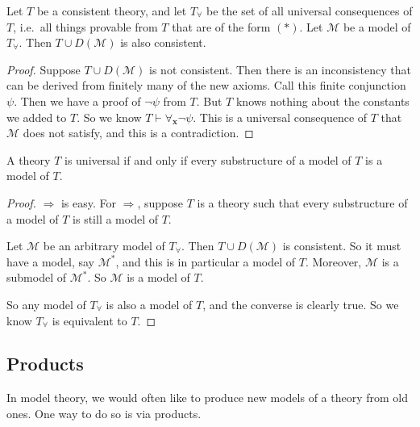 \documentclass[a4paper]{article}
\begin{document}
\begin{lemma}
  Let $T$ be a consistent theory, and let $T_{\forall}$ be the set of all universal consequences of $T$, i.e.\ all things provable from $T$ that are of the form $(*)$. Let $\mathcal{M}$ be a model of $T_\forall$. Then $T \cup D(\mathcal{M})$ is also consistent.
\end{lemma}

\begin{proof}
  Suppose $T \cup D(\mathcal{M})$ is not consistent. Then there is an inconsistency that can be derived from finitely many of the new axioms. Call this finite conjunction $\psi$. Then we have a proof of $\neg \psi$ from $T$. But $T$ knows nothing about the constants we added to $T$. So we know $T\vdash \forall_{\mathbf{x}} \neg \psi$. This is a universal consequence of $T$ that $\mathcal{M}$ does not satisfy, and this is a contradiction.
\end{proof}

\begin{thm}
  A theory $T$ is universal if and only if every substructure of a model of $T$ is a model of $T$.
\end{thm}

\begin{proof}
  $\Rightarrow$ is easy. For $\Rightarrow$, suppose $T$ is a theory such that every substructure of a model of $T$ is still a model of $T$.

  Let $\mathcal{M}$ be an arbitrary model of $T_\forall$. Then $T \cup D(\mathcal{M})$ is consistent. So it must have a model, say $\mathcal{M}^*$, and this is in particular a model of $T$. Moreover, $\mathcal{M}$ is a submodel of $\mathcal{M}^*$. So $\mathcal{M}$ is a model of $T$.

  So any model of $T_{\forall}$ is also a model of $T$, and the converse is clearly true. So we know $T_{\forall}$ is equivalent to $T$.
\end{proof}

\subsection{Products}
In model theory, we would often like to produce new models of a theory from old ones. One way to do so is via products.
\end{document}
